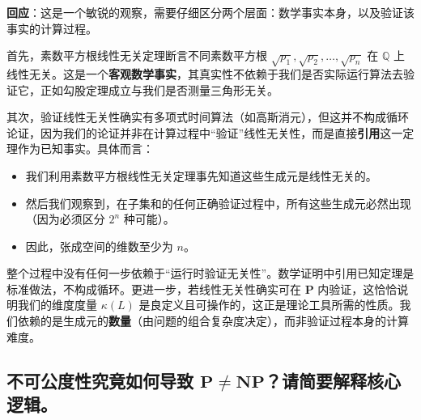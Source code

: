 \documentclass{ctexart}
\begin{document}
	\textbf{回应}：这是一个敏锐的观察，需要仔细区分两个层面：数学事实本身，以及验证该事实的计算过程。
	
	首先，素数平方根线性无关定理断言不同素数平方根 $\sqrt{p_1}, \sqrt{p_2}, \dots, \sqrt{p_n}$ 在 $\mathbb{Q}$ 上线性无关。这是一个\textbf{客观数学事实}，其真实性不依赖于我们是否实际运行算法去验证它，正如勾股定理成立与我们是否测量三角形无关。
	
	其次，验证线性无关性确实有多项式时间算法（如高斯消元），但这并不构成循环论证，因为我们的论证并非在计算过程中``验证''线性无关性，而是直接\textbf{引用}这一定理作为已知事实。具体而言：
	\begin{itemize}
		\item 我们利用素数平方根线性无关定理事先知道这些生成元是线性无关的。
		\item 然后我们观察到，在子集和的任何正确验证过程中，所有这些生成元必然出现（因为必须区分 $2^n$ 种可能）。
		\item 因此，张成空间的维数至少为 $n$。
	\end{itemize}
	整个过程中没有任何一步依赖于``运行时验证无关性''。数学证明中引用已知定理是标准做法，不构成循环。更进一步，若线性无关性确实可在 $\mathbf{P}$ 内验证，这恰恰说明我们的维度度量 $\kappa(L)$ 是良定义且可操作的，这正是理论工具所需的性质。我们依赖的是生成元的\textbf{数量}（由问题的组合复杂度决定），而非验证过程本身的计算难度。
	
	
	\subsection{不可公度性究竟如何导致 $\mathbf{P} \neq \mathbf{NP}$？请简要解释核心逻辑。}
	
\end{document}
